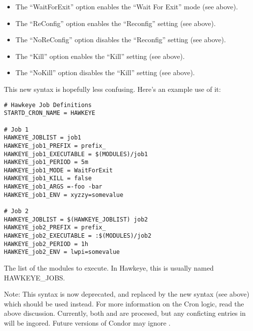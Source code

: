 \begin{description}
   \begin{itemize}

	\item The ``WaitForExit'' option enables the ``Wait For Exit''
	mode (see above).

	\item The ``ReConfig'' option enables the ``Reconfig'' setting
	(see above).

	\item The ``NoReConfig'' option disables the ``Reconfig'' setting
	(see above).

	\item The ``Kill'' option enables the ``Kill'' setting (see
	above).

	\item The ``NoKill'' option disables the ``Kill'' setting (see
	above).

    \end{itemize}

\Note This new syntax is hopefully less confusing.  Here's an example
use of it:
\begin{verbatim}
# Hawkeye Job Definitions
STARTD_CRON_NAME = HAWKEYE

# Job 1
HAWKEYE_JOBLIST = job1
HAWKEYE_job1_PREFIX = prefix_
HAWKEYE_job1_EXECUTABLE = $(MODULES)/job1
HAWKEYE_job1_PERIOD = 5m
HAWKEYE_job1_MODE = WaitForExit
HAWKEYE_job1_KILL = false
HAWKEYE_job1_ARGS =-foo -bar
HAWKEYE_job1_ENV = xyzzy=somevalue

# Job 2
HAWKEYE_JOBLIST = $(HAWKEYE_JOBLIST) job2
HAWKEYE_job2_PREFIX = prefix_
HAWKEYE_job2_EXECUTABLE = :$(MODULES)/job2
HAWKEYE_job2_PERIOD = 1h
HAWKEYE_job2_ENV = lwpi=somevalue
\end{verbatim}


\item[\Macro{STARTD\_CRON\_JOBS}]
\label{param:StartdCronJobs}
  The list of the modules to execute.  In Hawkeye, this is usually
  named HAWKEYE\_JOBS.

  Note: This syntax is now deprecated, and replaced by the new
   syntax (see above) which should be
  used instead.
  For more information on the Cron logic, read the above discussion.
  Currently, both  and
   are procesed, but any conficting
  entries in  will be ingored.  Future
  versions of Condor may ignore .


\end{description}
